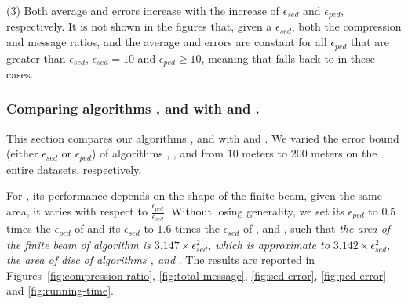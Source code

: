 {%

\ni (3) Both average \ped and \sed errors increase with the increase of $\epsilon_{sed}$ and $\epsilon_{ped}$, respectively. It is not shown in the figures that, given a $\epsilon_{sed}$, both the compression and message ratios, and the average \sed and \ped errors are constant for all $\epsilon_{ped}$ that are greater than $\epsilon_{sed}$, \eg $\epsilon_{sed}=10$ and $\epsilon_{ped} \ge 10$, meaning that \bitt falls back to \citt in these cases.




\subsubsection{Comparing algorithms \bitt, \sitt and \citt with \ldrh and \grts.}
This section compares our algorithms \citt, \sitt and \bitt with \ldrh and \grts.
We varied the error bound (either $\epsilon_{sed}$ or $\epsilon_{ped}$) of algorithms \citt, \sitt, \ldrh and \grts from $10$ meters to $200$ meters on the entire datasets, respectively. 
{For \bitt, its performance depends on the shape of the finite beam, \ie given the same area, it varies with respect to $\frac{\epsilon_{ped}}{\epsilon_{sed}}$. {Without losing generality}, we set its $\epsilon_{ped}$ to {$0.5$} times the $\epsilon_{ped}$ of \sitt and its $\epsilon_{sed}$ to {$1.6$} times the $\epsilon_{sed}$ of \citt, \grts and \ldrh, such that \emph{the area of the finite beam of algorithm \bitt is $3.147\times\epsilon_{sed}^2$, which is approximate to $3.142\times\epsilon_{sed}^2$, the area of disc of algorithms \ldrh, \grts and \citt}.
%
The results are reported in Figures~\ref{fig:compression-ratio}, \ref{fig:total-message}, \ref{fig:sed-error}, \ref{fig:ped-error} and \ref{fig:running-time}.


}}
